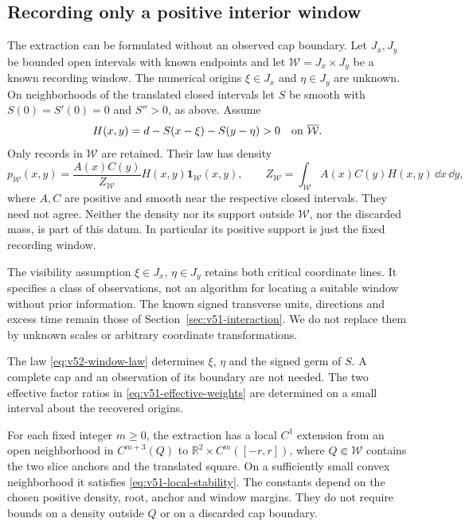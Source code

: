 \subsection{Recording only a positive interior window}
\label{subsec:v52-window}

The extraction can be formulated without an observed cap boundary.
Let $J_x,J_y$ be bounded open intervals with known endpoints and let
$\mathcal W=J_x\times J_y$ be a known recording window.  The numerical
origins $\xi\in J_x$ and $\eta\in J_y$ are unknown.  On neighborhoods
of the translated closed intervals let $S$ be smooth with
$S(0)=S'(0)=0$ and $S''>0$, as above.  Assume
\begin{equation}\label{eq:v52-window-margin}
 H(x,y)=d-S(x-\xi)-S(y-\eta)>0
             \quad\hbox{on }\overline{\mathcal W}.
\end{equation}
Only records in $\mathcal W$ are retained.  Their law has density
\begin{equation}\label{eq:v52-window-law}
 p_{\mathcal W}(x,y)=\frac{A(x)C(y)}{Z_{\mathcal W}}H(x,y)
                           \mathbf1_{\mathcal W}(x,y),\qquad
 Z_{\mathcal W}=\int_{\mathcal W}A(x)C(y)H(x,y)\,\dd x\,\dd y,
\end{equation}
where $A,C$ are positive and smooth near the respective closed intervals.
They need not agree.  Neither the density nor its support outside
$\mathcal W$, nor the discarded mass, is part of this datum.  In
particular its positive support is just the fixed recording window.

The visibility assumption $\xi\in J_x$, $\eta\in J_y$ retains both
critical coordinate lines.  It specifies a class of observations, not
an algorithm for locating a suitable window without prior information.
The known signed transverse units, directions and excess time remain
those of Section~\ref{sec:v51-interaction}.  We do not replace them by
unknown scales or arbitrary coordinate transformations.

\begin{theorem}
\label{thm:v52-window-extraction}
The law \eqref{eq:v52-window-law} determines $\xi$, $\eta$ and the
signed germ of $S$.  A complete cap and an observation of its boundary
are not needed.  The two effective factor ratios in
\eqref{eq:v51-effective-weights} are determined on a small interval
about the recovered origins.

For each fixed integer $m\ge0$, the extraction has a local $C^1$
extension from an open neighborhood in $C^{m+3}(Q)$ to
$\mathbb R^2\times C^m([-r,r])$, where
$Q\Subset\mathcal W$ contains the two slice anchors and the translated
square.  On a sufficiently small convex neighborhood it satisfies
\eqref{eq:v51-local-stability}.  The constants depend on the chosen
positive density, root, anchor and window margins.  They do not require
bounds on a density outside $Q$ or on a discarded cap boundary.
\end{theorem}

